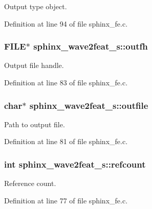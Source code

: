 Output type object. 



Definition at line 94 of file sphinx\+\_\+fe.\+c.

\subsubsection[{outfh}]{\setlength{\rightskip}{0pt plus 5cm}F\+I\+L\+E$\ast$ sphinx\+\_\+wave2feat\+\_\+s\+::outfh}\label{structsphinx__wave2feat__s_ad7340fab24fb182cbff2c73fd1fb3671}


Output file handle. 



Definition at line 83 of file sphinx\+\_\+fe.\+c.

\subsubsection[{outfile}]{\setlength{\rightskip}{0pt plus 5cm}char$\ast$ sphinx\+\_\+wave2feat\+\_\+s\+::outfile}\label{structsphinx__wave2feat__s_aa50405dc75074933912da57295ec5fbf}


Path to output file. 



Definition at line 81 of file sphinx\+\_\+fe.\+c.

\subsubsection[{refcount}]{\setlength{\rightskip}{0pt plus 5cm}int sphinx\+\_\+wave2feat\+\_\+s\+::refcount}\label{structsphinx__wave2feat__s_ae9b2fc4bfa6a3adbf2ee5a71796cdb51}


Reference count. 



Definition at line 77 of file sphinx\+\_\+fe.\+c.

